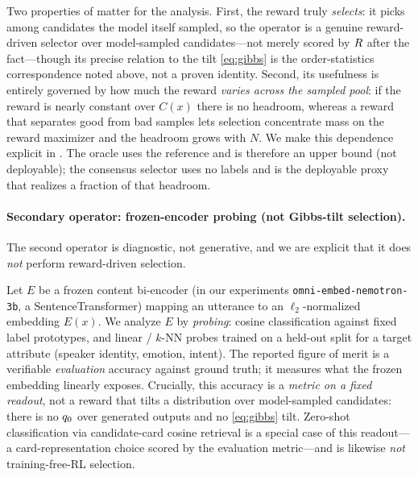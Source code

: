 Two properties of  matter for the analysis. First, the reward truly \emph{selects}: it picks among candidates the model itself sampled, so the operator is a genuine reward-driven selector over model-sampled candidates---not merely scored by $R$ after the fact---though its precise relation to the tilt \eqref{eq:gibbs} is the order-statistics correspondence noted above, not a proven identity. Second, its usefulness is entirely governed by how much the reward \emph{varies across the sampled pool}: if the reward is nearly constant over $C(x)$ there is no headroom, whereas a reward that separates good from bad samples lets selection concentrate mass on the reward maximizer and the headroom grows with $N$. We make this dependence explicit in . The oracle uses the reference and is therefore an upper bound (not deployable); the consensus selector uses no labels and is the deployable proxy that realizes a fraction of that headroom.

\paragraph{Secondary operator: frozen-encoder probing (not Gibbs-tilt selection).}
The second operator is diagnostic, not generative, and we are explicit that it does \emph{not} perform reward-driven selection.

\begin{definition}
\label{def:probe}
Let $E$ be a frozen content bi-encoder (in our experiments \texttt{omni-embed-nemotron-3b}, a SentenceTransformer) mapping an utterance to an $\ell_2$-normalized embedding $E(x)$. We analyze $E$ by \emph{probing}: cosine classification against fixed label prototypes, and linear / $k$-NN probes trained on a held-out split for a target attribute (speaker identity, emotion, intent). The reported figure of merit is a verifiable \emph{evaluation} accuracy against ground truth; it measures what the frozen embedding linearly exposes. Crucially, this accuracy is a \emph{metric on a fixed readout}, not a reward that tilts a distribution over model-sampled candidates: there is no $q_{0}$ over generated outputs and no \eqref{eq:gibbs} tilt. Zero-shot classification via candidate-card cosine retrieval is a special case of this readout---a card-representation choice scored by the evaluation metric---and is likewise \emph{not} training-free-RL selection.
\end{definition}

